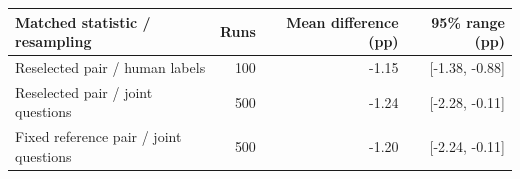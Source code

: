 \begin{tabular}{lrrr}
\toprule
Matched statistic / resampling & Runs & Mean difference (pp) & 95\% range (pp) \\
\midrule
Reselected pair / human labels & 100 & -1.15 & [-1.38, -0.88] \\
Reselected pair / joint questions & 500 & -1.24 & [-2.28, -0.11] \\
Fixed reference pair / joint questions & 500 & -1.20 & [-2.24, -0.11] \\
\bottomrule
\end{tabular}
